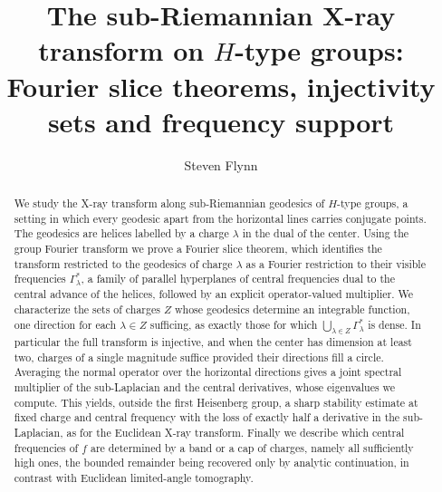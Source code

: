 \documentclass[11pt]{amsart}
\theoremstyle{plain}
\theoremstyle{definition}
\theoremstyle{remark}
\numberwithin{equation}{section}
\numberwithin{equation}{section}
\begin{document}
	\title[The sub-Riemannian X-ray transform on $H$-type groups]{The sub-Riemannian X-ray transform on $H$-type groups: Fourier slice theorems, injectivity sets and frequency support}

	\author[S. Flynn]{Steven Flynn}
	\address[S. Flynn]{Department of Mathematics, University College London, Gower Street, London WC1E 6BT, United Kingdom}


\begin{abstract}
	We study the X-ray transform along sub-Riemannian geodesics of $H$-type groups, a setting in which every geodesic apart from the horizontal lines carries conjugate points. The geodesics are helices labelled by a charge $\lambda$ in the dual of the center. Using the group Fourier transform we prove a Fourier slice theorem, which identifies the transform restricted to the geodesics of charge $\lambda$ as a Fourier restriction to their visible frequencies $\Gamma_\lambda^*$, a family of parallel hyperplanes of central frequencies dual to the central advance of the helices, followed by an explicit operator-valued multiplier. We characterize the sets of charges $Z$ whose geodesics determine an integrable function, one direction for each $\lambda\in Z$ sufficing, as exactly those for which $\bigcup_{\lambda\in Z}\Gamma_\lambda^*$ is dense. In particular the full transform is injective, and when the center has dimension at least two, charges of a single magnitude suffice provided their directions fill a circle. Averaging the normal operator over the horizontal directions gives a joint spectral multiplier of the sub-Laplacian and the central derivatives, whose eigenvalues we compute. This yields, outside the first Heisenberg group, a sharp stability estimate at fixed charge and central frequency with the loss of exactly half a derivative in the sub-Laplacian, as for the Euclidean X-ray transform. Finally we describe which central frequencies of $f$ are determined by a band or a cap of charges, namely all sufficiently high ones, the bounded remainder being recovered only by analytic continuation, in contrast with Euclidean limited-angle tomography.
\end{abstract}

\maketitle
\end{document}

